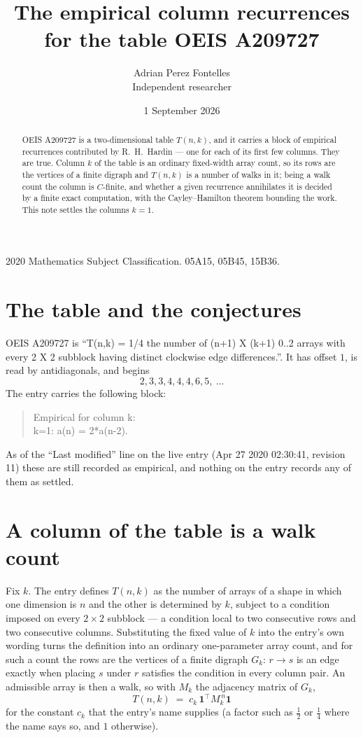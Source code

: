 \documentclass[11pt,a4paper]{article}
\title{The empirical column recurrences for the table OEIS A209727}
\author{Adrian Perez Fontelles\\ \small Independent researcher}
\date{1 September 2026}
\theoremstyle{plain}
\theoremstyle{definition}
\begin{document}
\maketitle

\begin{abstract}
OEIS A209727 is a two-dimensional table $T(n,k)$, and it carries a block of empirical
recurrences contributed by R.~H.~Hardin --- one for each of its first few columns. They are
true. Column $k$ of the table is an ordinary fixed-width array count, so its rows are the
vertices of a finite digraph and $T(n,k)$ is a number of walks in it; being a walk count the
column is $C$-finite, and whether a given recurrence annihilates it is decided by a finite
exact computation, with the Cayley--Hamilton theorem bounding the work. This note settles the
columns $k=1$.
\end{abstract}

\noindent\small 2020 Mathematics Subject Classification. 05A15, 05B45, 15B36.\normalsize

\section{The table and the conjectures}

OEIS A209727 is ``T(n,k) = 1/4 the number of (n+1) X (k+1) 0..2 arrays with every 2 X 2 subblock having distinct clockwise edge differences.''. It has offset $1$, is
read by antidiagonals, and begins
\[
2, 3, 3, 4, 4, 4, 6, 5,\ \dots
\]
The entry carries the following block:
\begin{quote}\small
Empirical for column k:\\
k=1: a(n) = 2*a(n-2).\\
\end{quote}
As of the ``Last modified'' line on the live entry (Apr 27 2020 02:30:41, revision 11) these are still
recorded as empirical, and nothing on the entry records any of them as settled.

\section{A column of the table is a walk count}

Fix $k$. The entry defines $T(n,k)$ as the number of arrays of a shape in which one dimension
is $n$ and the other is determined by $k$, subject to a condition imposed on every
$2\times2$ subblock --- a condition local to two consecutive rows and two consecutive columns.
Substituting the fixed value of $k$ into the entry's own wording turns the definition into an
ordinary one-parameter array count, and for such a count the rows are the vertices of a finite
digraph $G_k$: $r\to s$ is an edge exactly when placing $s$ under $r$ satisfies the condition
in every column pair. An admissible array is then a walk, so with $M_k$ the adjacency matrix
of $G_k$,
\[
T(n,k)\;=\;c_k\,\mathbf{1}^{\!\top}M_k^{\,n}\mathbf{1}
\]
for the constant $c_k$ that the entry's name supplies (a factor such as $\tfrac12$ or
$\tfrac14$ where the name says so, and $1$ otherwise).
\end{document}
